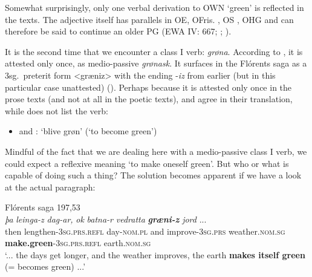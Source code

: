 \documentclass[output=paper,colorlinks,citecolor=brown]{langscibook}
\begin{document}
Somewhat surprisingly, only one verbal derivation to OWN  ‘green’ is reflected in the texts. The adjective itself has parallels in OE, OFris. , OS , OHG  and can therefore be said to continue an older PG  (EWA IV: 667; ; ).

It is the second time that we encounter a class I verb: \textit{grøna}. According to , it is attested only once, as medio-passive \textit{grønask}. It surfaces in the Flórents saga as a 3sg.\ preterit form <græniz> with the ending -\textit{iz} from earlier (but in this particular case unattested)  (). Perhaps because it is attested only once in the prose texts (and not at all in the poetic texts),  and  agree in their translation, while  does not list the verb:

\begin{itemize}
\item {} and : ‘blive grøn’ (‘to become green’)
\end{itemize}

Mindful of the fact that we are dealing here with a medio-passive class I verb, we could expect a reflexive  meaning ‘to make oneself green’. But who or what is capable of doing such a thing? The solution becomes apparent if we have a look at the actual paragraph: 
 
\begin{exe}
    \ex Flórents saga 197,53 \label{ex:grona}\\
     \textit{þa} \textit{leinga-z} \textit{dag-ar,} \textit{ok} \textit{batna-r} \textit{vedratta} {\textit{\textbf{græni-z}}} {\textit{jord} ...}\\
      {} then lengthen-\textsc{3sg.prs.refl} day-\textsc{nom.pl} and improve-\textsc{3sg.prs} weather.\textsc{nom.sg} \textbf{make.green}-\textsc{3sg.prs.refl} earth.\textsc{nom.sg} {}\\
    \glt ‘... the days get longer, and the weather improves, the earth \textbf{makes itself green} (= becomes green) ...’ 
\end{exe}
\end{document}
